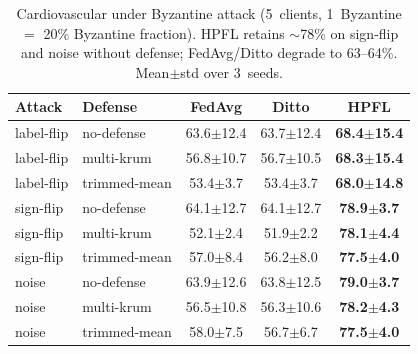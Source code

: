 \documentclass[conference]{IEEEtran}
\begin{document}
\begin{table}[htbp]
\centering
\caption{Cardiovascular under Byzantine attack (5~clients, 1~Byzantine $=$ 20\% Byzantine fraction). HPFL retains $\sim$78\% on sign-flip and noise without defense; FedAvg/Ditto degrade to 63--64\%. Mean$\pm$std over 3~seeds.}
\label{tab:tier_b_byz_cv}
\small
\setlength{\tabcolsep}{4pt}
\begin{tabular}{llccc}
\toprule
\textbf{Attack} & \textbf{Defense} & \textbf{FedAvg} & \textbf{Ditto} & \textbf{HPFL} \\
\midrule
label-flip & no-defense & 63.6$\pm$12.4 & 63.7$\pm$12.4 & \textbf{68.4$\pm$15.4} \\
label-flip & multi-krum & 56.8$\pm$10.7 & 56.7$\pm$10.5 & \textbf{68.3$\pm$15.4} \\
label-flip & trimmed-mean & 53.4$\pm$3.7 & 53.4$\pm$3.7 & \textbf{68.0$\pm$14.8} \\
sign-flip & no-defense & 64.1$\pm$12.7 & 64.1$\pm$12.7 & \textbf{78.9$\pm$3.7} \\
sign-flip & multi-krum & 52.1$\pm$2.4 & 51.9$\pm$2.2 & \textbf{78.1$\pm$4.4} \\
sign-flip & trimmed-mean & 57.0$\pm$8.4 & 56.2$\pm$8.0 & \textbf{77.5$\pm$4.0} \\
noise & no-defense & 63.9$\pm$12.6 & 63.8$\pm$12.5 & \textbf{79.0$\pm$3.7} \\
noise & multi-krum & 56.5$\pm$10.8 & 56.3$\pm$10.6 & \textbf{78.2$\pm$4.3} \\
noise & trimmed-mean & 58.0$\pm$7.5 & 56.7$\pm$6.7 & \textbf{77.5$\pm$4.0} \\
\bottomrule
\end{tabular}
\end{table}
\end{document}
